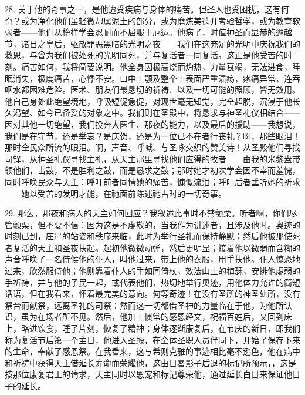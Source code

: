 28. 关于他的奇事之一，是他遭受疾病与身体的痛苦。但圣人也受困扰，这有何奇？或为净化他们虽轻微却属泥土的部分，或为磨炼美德并考验哲学，或为教育软弱者——他们从榜样学会忍耐而不屈服于厄运。他病了，时值神圣而显赫的逾越节，诸日之皇后，驱散罪恶黑暗的光明之夜——我们在这充足的光明中庆祝我们的救恩，与曾为我们被处死的光明同死，并与复活者一同复活。这正是他受苦的时刻。痛苦如何，我将简要说明。他全身因极高烧而灼热，力量衰竭，无法进食，睡眠消失，极度痛苦，心悸不安。口中上颚及整个上表面严重溃疡，疼痛异常，连吞咽水都困难危险。医术、朋友们最恳切的祈祷、以及一切可能的照顾，皆无效用。他自己身处此绝望境地，呼吸短促急促，对现世毫无知觉，完全超脱，沉浸于他长久渴望、如今已备妥的对象之中。我们则在圣殿中，将恳求与神圣礼仪相结合——因对其他一切绝望，我们投奔大医生、那夜的能力，以及最后的援助——我想说，我们是在守节，还是举哀？是庆贺，还是为一位已不在者行丧礼？啊，那些眼泪！那时全民众所流的眼泪。啊，声音、呼喊、与圣咏交织的赞美诗！从圣殿他们寻找司铎，从神圣礼仪寻找主礼，从天主那里寻找他们应得的牧者——由我的米黎盎带领他们，击鼓，不是胜利之鼓，而是恳求之鼓；那时她才初次学会因不幸而羞愧，同时呼唤民众与天主：呼吁前者同情她的痛苦，慷慨流泪；呼吁后者垂听她的祈求——她以受苦的发明才能，在祂面前陈述祂古时的一切奇事。\par

29. 那么，那夜和病人的天主如何回应？我叙述此事时不禁颤栗。听者啊，你们尽管颤栗，但不要不信：因为这是不虔敬的，当我作为讲述者，且涉及他时。奥迹的时刻已到，庄严的站姿和秩序来临，此时为举行圣礼而保持静默；然后他被那使死者复活的天主和圣夜扶起。起初他微微动弹，然后更明显；接着他以微弱而含糊的声音呼唤了一名侍候他的仆人，叫他过来，带上他的衣服，用手扶他。仆人惊恐地过来，欣然服侍他；他则靠着仆人的手如同倚杖，效法山上的梅瑟，安排他虚弱的手祈祷，并与他的子民一起，或代表他们，热切地举行奥迹，用他体力允许的简短话语，但在我看来，怀着最完美的意向。何等奇迹！在没有圣所的神圣处所，没有祭台而献祭，远离圣礼的司祭：然而这一切都借圣神的力量临在于他，为他所认识，虽为在场者所不见。然后，他加上惯常的感恩经文，祝福百姓后，又回到床上，略进饮食，睡了片刻，恢复了精神；身体逐渐康复后，在节庆的新日，即我们称为复活节后第一个主日，他进入圣殿，在全体圣职人员伴同下，开始了保存下来的生命，奉献了感恩祭。在我看来，这与希则克雅的事迹相比毫不逊色，他在病中和祈祷中获得天主借延长寿命而荣耀他，这由日晷影子后退的标记所预示，，这是按那位康复君王的请求，天主同时以恩宠和标记尊荣他，通过延长白日来保证他日子的延长。\par

